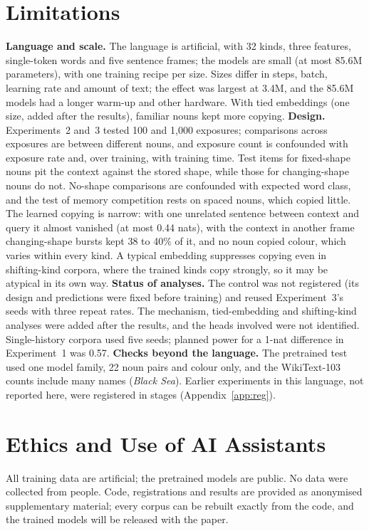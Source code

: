 \documentclass{article}
\begin{document}
\section{Limitations}
\textbf{Language and scale.} The language is artificial, with 32 kinds, three features, single-token words and five sentence frames; the models are small (at most 85.6M parameters), with one training recipe per size. Sizes differ in steps, batch, learning rate and amount of text; the effect was largest at 3.4M, and the 85.6M models had a longer warm-up and other hardware. With tied embeddings (one size, added after the results), familiar nouns kept more copying. \textbf{Design.} Experiments~2 and~3 tested 100 and 1,000 exposures; comparisons across exposures are between different nouns, and exposure count is confounded with exposure rate and, over training, with training time. Test items for fixed-shape nouns pit the context against the stored shape, while those for changing-shape nouns do not. No-shape comparisons are confounded with expected word class, and the test of memory competition rests on spaced nouns, which copied little. The learned copying is narrow: with one unrelated sentence between context and query it almost vanished (at most 0.44 nats), with the context in another frame changing-shape bursts kept 38 to 40\% of it, and no noun copied colour, which varies within every kind. A typical embedding suppresses copying even in shifting-kind corpora, where the trained kinds copy strongly, so it may be atypical in its own way. \textbf{Status of analyses.} The control was not registered (its design and predictions were fixed before training) and reused Experiment~3's seeds with three repeat rates. The mechanism, tied-embedding and shifting-kind analyses were added after the results, and the heads involved were not identified. Single-history corpora used five seeds; planned power for a 1-nat difference in Experiment~1 was 0.57. \textbf{Checks beyond the language.} The pretrained test used one model family, 22 noun pairs and colour only, and the WikiText-103 counts include many names (\emph{Black Sea}). Earlier experiments in this language, not reported here, were registered in stages (Appendix~\ref{app:reg}).

\section{Ethics and Use of AI Assistants}
All training data are artificial; the pretrained models are public. No data were collected from people. Code, registrations and results are provided as anonymised supplementary material; every corpus can be rebuilt exactly from the code, and the trained models will be released with the paper.
\end{document}
